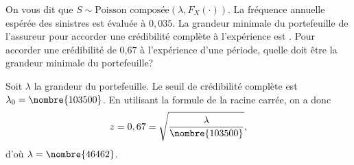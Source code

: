 \begin{exercice}
  On vous dit que $S \sim \text{Poisson composée}(\lambda,
  F_X(\cdot))$. La fréquence annuelle espérée des sinistres est
  évaluée à $0,035$. La grandeur minimale du portefeuille de
  l'assureur pour accorder une crédibilité complète à l'expérience est
  . Pour accorder une crédibilité de 0,67 à
  l'expérience d'une période, quelle doit être la grandeur minimale du
  portefeuille?
  \begin{rep}
  \end{rep}
  \begin{sol}
    Soit $\lambda$ la grandeur du portefeuille. Le seuil de
    crédibilité complète est $\lambda_0 = \nombre{103500}$. En
    utilisant la formule de la racine carrée, on a donc
    \begin{displaymath}
      z = 0,67 = \sqrt{\frac{\lambda}{\nombre{103500}}},
    \end{displaymath}
    d'où $\lambda = \nombre{46462}$.
  \end{sol}
\end{exercice}


